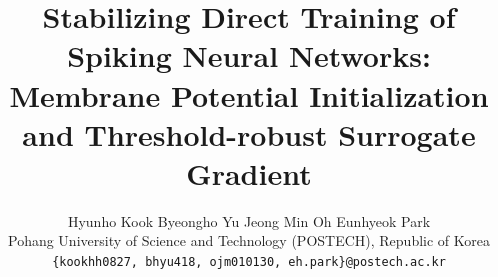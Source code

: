 \documentclass[10pt,twocolumn,letterpaper]{article}
\title{Stabilizing Direct Training of Spiking Neural Networks: Membrane Potential Initialization and Threshold-robust Surrogate Gradient}
\author{
Hyunho Kook\quad
Byeongho Yu\quad
Jeong Min Oh\quad
Eunhyeok Park\\
Pohang University of Science and Technology (POSTECH), Republic of Korea\\
{\tt\small \{kookhh0827, bhyu418, ojm010130, eh.park\}@postech.ac.kr}
}
\begin{document}
\maketitle
    







{
    \small
    
    
}




\end{document}
